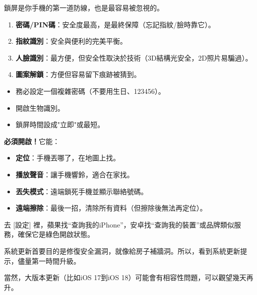 


鎖屏是你手機的第一道防線，也是最容易被忽視的。


\begin{enumerate}
  \item \textbf{密碼/PIN碼}：安全度最高，是最終保障（忘記指紋/臉時靠它）。
  \item \textbf{指紋識別}：安全與便利的完美平衡。
  \item \textbf{人臉識別}：最方便，但安全性取決於技術（3D結構光安全，2D照片易騙過）。
  \item \textbf{圖案解鎖}：方便但容易留下痕跡被猜到。
\end{enumerate}


\begin{itemize}
  \item 務必設定一個複雜密碼（不要用生日、123456）。
  \item 開啟生物識別。
  \item 鎖屏時間設成"立即"或最短。
\end{itemize}


\textbf{必須開啟！}它能：

\begin{itemize}
  \item \textbf{定位}：手機丟哪了，在地圖上找。
  \item \textbf{播放聲音}：讓手機響鈴，適合在家找。
  \item \textbf{丟失模式}：遠端鎖死手機並顯示聯絡號碼。
  \item \textbf{遠端擦除}：最後一招，清除所有資料（但擦除後無法再定位）。
\end{itemize}

去 [設定] 裡，蘋果找“查詢我的iPhone”，安卓找“查詢我的裝置”或品牌類似服務，確保它是綠色開啟狀態。


系統更新首要目的是修復安全漏洞，就像給房子補牆洞。所以，看到系統更新提示，儘量第一時間升級。

當然，大版本更新（比如iOS 17到iOS 18）可能會有相容性問題，可以觀望幾天再升。

